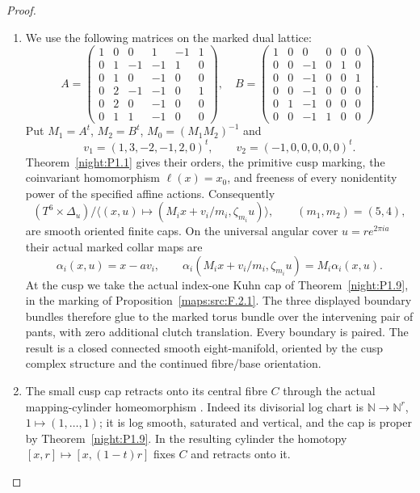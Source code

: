 \begin{proof}
\begin{enumerate}[label=\arabic*.]
\item We use the following matrices on the marked dual lattice:
\[
A=\begin{pmatrix}
1&0&0&1&-1&1\\0&1&-1&-1&1&0\\0&1&0&-1&0&0\\
0&2&-1&-1&0&1\\0&2&0&-1&0&0\\0&1&1&-1&0&0
\end{pmatrix},\quad
B=\begin{pmatrix}
1&0&0&0&0&0\\0&0&-1&0&1&0\\0&0&-1&0&0&1\\
0&0&-1&0&0&0\\0&1&-1&0&0&0\\0&0&-1&1&0&0
\end{pmatrix}.
\]
Put $M_1=A^t$, $M_2=B^t$, $M_0=(M_1M_2)^{-1}$ and
\[
 v_1=(1,3,-2,-1,2,0)^t,\qquad v_2=(-1,0,0,0,0,0)^t.
\]
Theorem~\ref{night:P1.1} gives their orders, the primitive cusp
marking, the coinvariant homomorphism $\ell(x)=x_0$, and freeness of
every nonidentity power of the specified affine actions. Consequently
\[
 (T^6\times\Delta_u)/
 \langle(x,u)\mapsto(M_ix+v_i/m_i,\zeta_{m_i}u)\rangle,
 \qquad (m_1,m_2)=(5,4),
\]
are smooth oriented finite caps. On the universal angular cover
$u=r e^{2\pi ia}$ their actual marked collar maps are
\[
 \alpha_i(x,u)=x-av_i,
 \qquad
 \alpha_i(M_ix+v_i/m_i,\zeta_{m_i}u)=M_i\alpha_i(x,u).
\]
At the cusp we take the actual index-one Kuhn cap of
Theorem~\ref{night:P1.9}, in the marking of
Proposition~\ref{maps:src:F.2.1}. The three displayed boundary bundles
therefore glue to the marked torus bundle over the intervening pair
of pants, with zero additional clutch translation. Every boundary
is paired. The result is a closed connected smooth eight-manifold,
oriented by the cusp complex structure and the continued fibre/base
orientation.

\item The small cusp cap retracts onto its central fibre $C$ through
the actual mapping-cylinder homeomorphism
\cite[Theorem 4.1.1 and Lemmas 4.1.2--4.1.3, pp.~480--482]{ffAchingerOgus20}.
Indeed its divisorial log chart is
$\mathbb N\to\mathbb N^r$, $1\mapsto(1,\ldots,1)$; it is log smooth,
saturated and vertical, and the cap is proper by
Theorem~\ref{night:P1.9}. In the resulting cylinder the homotopy
$[x,r]\mapsto[x,(1-t)r]$ fixes $C$ and retracts onto it.


\end{enumerate}
\end{proof}
